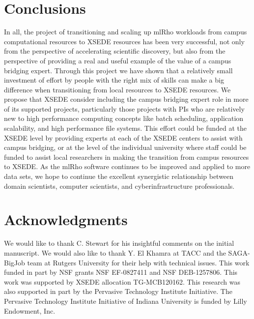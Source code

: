 \documentclass{sig-alternate}
\begin{document}
\section{Conclusions}\label{sec:conclusion}

In all, the project of transitioning and scaling up mlRho workloads from campus computational resources
to XSEDE resources has been very successful, not only from the perspective of accelerating scientific
discovery, but also from the perspective of providing a real and useful example of the value of a campus
bridging expert. Through this project we have shown that a relatively small investment of effort by people
with the right mix of skills can make a big difference when transitioning from local
resources to XSEDE resources. We propose that XSEDE consider including the campus bridging expert role in more
of its supported projects, particularly those projects with PIs who are relatively new to high performance
computing concepts like batch scheduling, application scalability, and high performance file systems. This
effort could be funded at the XSEDE level by providing experts at each of the XSEDE centers
to assist with campus bridging, or at the level of the individual university where staff could be funded to
assist local researchers in making the transition from campus resources to XSEDE. As the
mlRho software continues to be improved and applied to more data sets, we hope to continue the excellent
synergistic relationship between domain scientists, computer scientists, and cyberinfrastructure
professionals.


\section{Acknowledgments}
We would like to thank C. Stewart for his insightful comments on the initial manuscript. We would also like to thank Y. El Khamra at TACC and the SAGA-BigJob team at Rutgers University for their help with technical issues. This work funded in part by NSF grants NSF EF-0827411 and NSF DEB-1257806. This work was
supported by XSEDE allocation TG-MCB120162. This research was also supported in part by the Pervasive
Technology Institute Initiative. The Pervasive Technology Institute Initiative of Indiana University is funded
by Lilly Endowment, Inc.
%

%
%
\end{document}
